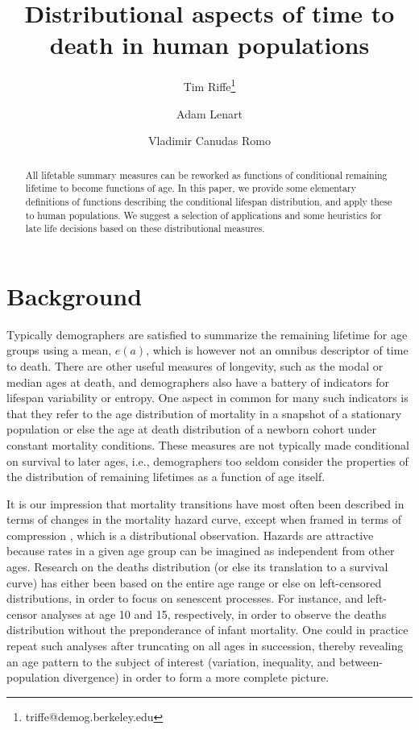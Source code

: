 \documentclass{article}
\begin{document}
\title{Distributional aspects of time to death in human populations}

\author[1]{Tim Riffe\thanks{triffe@demog.berkeley.edu}}
\author[2,3]{Adam Lenart}
\author[2,3]{Vladimir Canudas Romo}


\maketitle

\begin{abstract}
All lifetable summary measures can be reworked as functions of conditional
remaining lifetime to become functions of age. In this paper, we provide
some elementary definitions of functions describing the conditional lifespan
distribution, and apply these to human populations.
We suggest a selection of applications and some heuristics for late life
decisions based on these distributional measures.
\end{abstract}


\section*{Background}

Typically demographers are satisfied to summarize the remaining lifetime for age
groups using a mean, $e(a)$, which is however not an omnibus descriptor of time
to death. There are other useful measures of longevity, such as
the modal or median ages at death, and demographers also have a battery of
indicators for lifespan variability or entropy. One aspect in common for many
such indicators is that they refer to the age distribution of mortality in a snapshot of a stationary population or else the age at death distribution of a newborn cohort under constant mortality
conditions. These measures are not typically made conditional on survival to
later ages, i.e., demographers too seldom consider the properties of the
distribution of remaining lifetimes as a function of age itself. 

It is our impression that mortality transitions have most
often been described in terms of changes in the mortality hazard curve, except
when framed in terms of compression \citep[e.g.,][]{fries1980aging}, which is a
distributional observation.
Hazards are attractive because rates in a given
age group can be imagined as independent from other ages. Research on
the deaths distribution (or else its translation to a survival curve) has either
been based on the entire age range
\citep[e.g.,][]{wilmoth1999rectangularization, engelman2010implications}
or else on left-censored distributions, in order to focus on senescent processes.  For instance, \citet{edwards2005inequality}
and \citet{gillespie2014divergence} left-censor analyses at
age 10 and 15, respectively, in order to observe the deaths distribution without the preponderance of infant mortality. One could in practice repeat such analyses after truncating on all ages in succession, thereby revealing an age pattern to the subject of interest
(variation, inequality, and between-population divergence) in order to form a
more complete picture.
\end{document}
